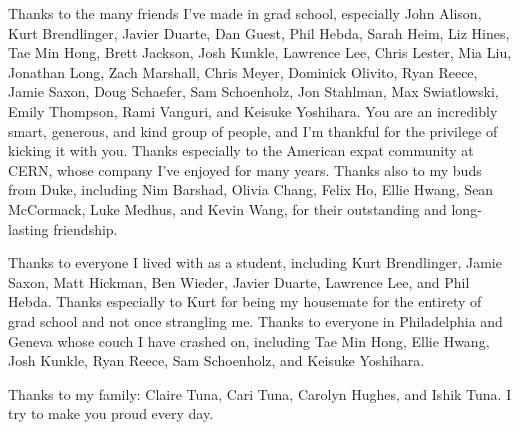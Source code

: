 Thanks to the many friends I've made in grad school, especially John Alison, Kurt Brendlinger, Javier Duarte, Dan Guest, Phil Hebda, Sarah Heim, Liz Hines, Tae Min Hong, Brett Jackson, Josh Kunkle, Lawrence Lee, Chris Lester, Mia Liu, Jonathan Long, Zach Marshall, Chris Meyer, Dominick Olivito, Ryan Reece, Jamie Saxon, Doug Schaefer, Sam Schoenholz, Jon Stahlman, Max Swiatlowski, Emily Thompson, Rami Vanguri, and Keisuke Yoshihara. You are an incredibly smart, generous, and kind group of people, and I'm thankful for the privilege of kicking it with you. Thanks especially to the American expat community at CERN, whose company I've enjoyed for many years. Thanks also to my buds from Duke, including Nim Barshad, Olivia Chang, Felix Ho, Ellie Hwang, Sean McCormack, Luke Medhus, and Kevin Wang, for their outstanding and long-lasting friendship.

Thanks to everyone I lived with as a student, including Kurt Brendlinger, Jamie Saxon, Matt Hickman, Ben Wieder, Javier Duarte, Lawrence Lee, and Phil Hebda. Thanks especially to Kurt for being my housemate for the entirety of grad school and not once strangling me. Thanks to everyone in Philadelphia and Geneva whose couch I have crashed on, including Tae Min Hong, Ellie Hwang, Josh Kunkle, Ryan Reece, Sam Schoenholz, and Keisuke Yoshihara.

Thanks to my family: Claire Tuna, Cari Tuna, Carolyn Hughes, and Ishik Tuna. I try to make you proud every day.

